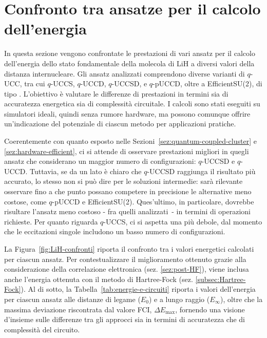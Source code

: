 \section{Confronto tra ansatze per il calcolo dell’energia}\label{sez:contronti-UCC}

In questa sezione vengono confrontate le prestazioni di vari ansatz per il calcolo dell’energia dello stato fondamentale della molecola di LiH a diversi valori della distanza internucleare. Gli ansatz analizzati comprendono diverse varianti di $q$-UCC, tra cui $q$-UCCS, $q$-UCCD, $q$-UCCSD, e $q$-pUCCD, oltre a EfficientSU(2), di tipo . L’obiettivo è valutare le differenze di prestazioni in termini sia di accuratezza energetica sia di complessità circuitale. I calcoli sono stati eseguiti su simulatori ideali, quindi senza rumore hardware, ma possono comunque offrire un’indicazione del potenziale di ciascun metodo per applicazioni pratiche.

Coerentemente con quanto esposto nelle Sezioni~\ref{sez:quantum-coupled-cluster} e \ref{sez:hardware-efficient}, ci si attende di osservare prestazioni migliori in quegli ansatz che considerano un maggior numero di configurazioni: $q$-UCCSD e $q$-UCCD.  Tuttavia, se da un lato è chiaro che $q$-UCCSD raggiunga il risultato più accurato, lo stesso non si può dire per le soluzioni intermedie: sarà rilevante osservare fino a che punto possano competere in precisione le alternative meno costose, come $q$-pUCCD e EfficientSU(2). Ques'ultimo, in particolare, dovrebbe risultare l’ansatz meno costoso - fra quelli analizzati~- in termini di operazioni richieste. Per quanto riguarda $q$-UCCS, ci si aspetta una  più debole, dal momento che le eccitazioni singole includono un basso numero di configurazioni.

La Figura~\ref{fig:LiH-confronti} riporta il confronto tra i valori energetici calcolati per ciascun ansatz. Per contestualizzare il miglioramento ottenuto grazie alla considerazione della correlazione elettronica (sez. \ref{sez:post-HF}), viene inclusa anche l’energia ottenuta con il metodo di Hartree-Fock (sez. \ref{subsec:Hartree-Fock}). Al di sotto, la Tabella~\ref{tab:energie-e-circuiti} riporta i valori dell’energia per ciascun ansatz alle distanze di legame ($E_0$) e a lungo raggio ($E_\infty$), oltre che la massima deviazione riscontrata dal valore FCI, $\Delta E_{\text{max}}$, fornendo una visione d'insieme sulle differenze tra gli approcci sia in termini di accuratezza che di complessità del circuito.

